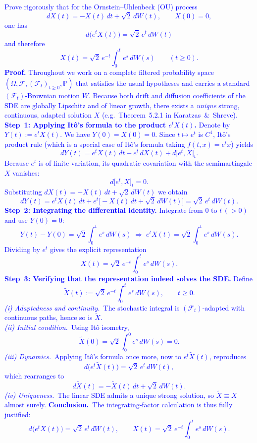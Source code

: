 \documentclass{article}
\begin{document}
\textcolor{blue}{
    Prove rigorously that for the Ornstein–Uhlenbeck (OU) process  
$$dX(t)=-X(t)\,dt+\sqrt{2}\,dW(t),\qquad X(0)=0,$$  
one has  
$$d\!\bigl(e^{t}X(t)\bigr)=\sqrt{2}\,e^{t}\,dW(t)$$  
and therefore  
$$X(t)=\sqrt{2}\,e^{-t}\int_{0}^{t}e^{s}\,dW(s)\qquad(t\ge0).$$  
\bigskip
\textbf{Proof.}  
Throughout we work on a complete filtered probability space $({\Omega},\mathcal
F,(\mathcal F_t)_{t\ge0},\mathbb P)$ that satisfies the usual hypotheses and
carries a standard $(\mathcal F_t)$‑Brownian motion $W$.  Because both drift
and diffusion coefficients of the SDE are globally Lipschitz and of linear
growth, there exists a \emph{unique} strong, continuous, adapted solution $X$
(e.g.\ Theorem 5.2.1 in Karatzas \& Shreve).
\medskip
\textbf{Step 1: Applying Itô’s formula to the product \(e^{t}X(t)\).}  
Denote by $Y(t):=e^{t}X(t)$.  We have $Y(0)=X(0)=0$.  Since $t\mapsto e^{t}$ is $C^{1}$, Itô’s product rule (which is a special case of Itô’s formula taking $f(t,x)=e^{t}x$) yields
$$
dY(t)=e^{t}X(t)\,dt+e^{t}\,dX(t)+d\bigl[e^{t},X\bigr]_t.
$$
Because $e^{t}$ is of finite variation, its quadratic covariation with the semimartingale $X$ vanishes:
$$
d\bigl[e^{t},X\bigr]_t=0.
$$
Substituting $dX(t)=-X(t)\,dt+\sqrt{2}\,dW(t)$ we obtain
$$
dY(t)=e^{t}X(t)\,dt+e^{t}\bigl[-X(t)\,dt+\sqrt{2}\,dW(t)\bigr]
      =\sqrt{2}\,e^{t}\,dW(t).
$$
\medskip
\textbf{Step 2: Integrating the differential identity.}  
Integrate from $0$ to $t\,(>0)$ and use $Y(0)=0$:
$$
Y(t)-Y(0)=\sqrt{2}\int_{0}^{t}e^{s}\,dW(s)\;\Longrightarrow\;
e^{t}X(t)=\sqrt{2}\int_{0}^{t}e^{s}\,dW(s).
$$
Dividing by $e^{t}$ gives the explicit representation
$$
X(t)=\sqrt{2}\,e^{-t}\int_{0}^{t}e^{s}\,dW(s).
$$
\medskip
\textbf{Step 3: Verifying that the representation indeed solves the SDE.}  
Define
$$
\widetilde{X}(t):=\sqrt{2}\,e^{-t}\int_{0}^{t}e^{s}\,dW(s),\qquad t\ge0.
$$
\emph{(i) Adaptedness and continuity.} The stochastic integral is $(\mathcal F_t)$‑adapted with continuous paths, hence so is $\widetilde{X}$.   \\
\emph{(ii) Initial condition.} Using Itô isometry,
$$
\widetilde{X}(0)=\sqrt{2}\int_{0}^{0}e^{s}\,dW(s)=0.
$$
\emph{(iii) Dynamics.} Applying Itô’s formula once more, now to $e^{t}\widetilde{X}(t)$, reproduces
$$
d\!\bigl(e^{t}\widetilde{X}(t)\bigr)=\sqrt{2}\,e^{t}\,dW(t),
$$
which rearranges to
$$
d\widetilde{X}(t)=-\widetilde{X}(t)\,dt+\sqrt{2}\,dW(t).
$$
\emph{(iv) Uniqueness.} The linear SDE admits a unique strong solution, so $\widetilde{X}\equiv X$ almost surely.  
\medskip
\textbf{Conclusion.} The integrating‑factor calculation is thus fully justified:  
$$d\!\bigl(e^{t}X(t)\bigr)=\sqrt{2}\,e^{t}\,dW(t),\qquad
  X(t)=\sqrt{2}\,e^{-t}\int_{0}^{t}e^{s}\,dW(s). $$
}
\end{document}
